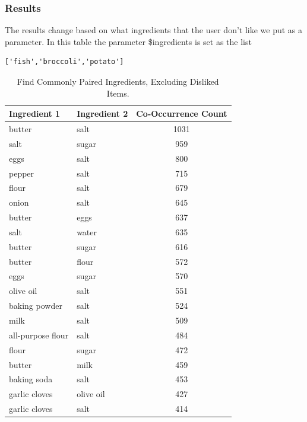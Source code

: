 \begin{enumerate}
    \subsubsection{Results}
    The results change based on what ingredients that the user don't like we put as a parameter. In this table the parameter  \$ingredients is set as the list \begin{verbatim}['fish','broccoli','potato']\end{verbatim}
    \begin{table}[h!]
\small %
\centering
\begin{tabularx}{\textwidth}{>{\raggedright\arraybackslash}X>{\raggedright\arraybackslash}Xc}
\toprule
\textbf{Ingredient 1} & \textbf{Ingredient 2} & \textbf{Co-Occurrence Count} \\
\midrule
butter            & salt              & 1031 \\
salt              & sugar             & 959  \\
eggs              & salt              & 800  \\
pepper            & salt              & 715  \\
flour             & salt              & 679  \\
onion             & salt              & 645  \\
butter            & eggs              & 637  \\
salt              & water             & 635  \\
butter            & sugar             & 616  \\
butter            & flour             & 572  \\
eggs              & sugar             & 570  \\
olive oil         & salt              & 551  \\
baking powder     & salt              & 524  \\
milk              & salt              & 509  \\
all-purpose flour & salt              & 484  \\
flour             & sugar             & 472  \\
butter            & milk              & 459  \\
baking soda       & salt              & 453  \\
garlic cloves     & olive oil         & 427  \\
garlic cloves     & salt              & 414  \\
\bottomrule
\end{tabularx}
\caption{Find Commonly Paired Ingredients, Excluding Disliked Items.}
\label{tab:cooccurrence_data}
\end{table}


\end{enumerate}
